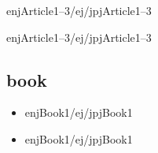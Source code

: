 \documentclass[10pt, a4paper]{jsarticle}
\newcommand{\putlst}[1]{
  \noindent\makebox[\linewidth]{\rule{\linewidth}{0.4pt}}\vspace{-1.5zw}
  \vspace{-1.8zw}
  \noindent\makebox[\linewidth]{\rule{\linewidth}{0.4pt}}\vspace{0.5zw}\par
}
\begin{document}
\begin{bibunit}[IEEJtran]
  enjArticle1--3/ej/jpjArticle1--3 \cite{enjArticle1/ej/jpjArticle1,enjArticle2/ej/jpjArticle2,enjArticle3/ej/jpjArticle3}
  {\small {}}
\end{bibunit}
\begin{bibunit}[jIEEEtran]
  enjArticle1--3/ej/jpjArticle1--3 \cite{enjArticle1/ej/jpjArticle1,enjArticle2/ej/jpjArticle2,enjArticle3/ej/jpjArticle3}
  {\small {}}
\end{bibunit}

\subsection{book}

\putlst{bib/ejbook.bib}

\begin{bibunit}[IEEJtran]
  \begin{itemize}
    \item enjBook1/ej/jpjBook1 \cite{enjBook1/ej/jpjBook1}
  \end{itemize}
  {\small {}}
\end{bibunit}
\begin{bibunit}[jIEEEtran]
  \begin{itemize}
    \item enjBook1/ej/jpjBook1 \cite{enjBook1/ej/jpjBook1}
  \end{itemize}
  {\small {}}
\end{bibunit}
\end{document}
